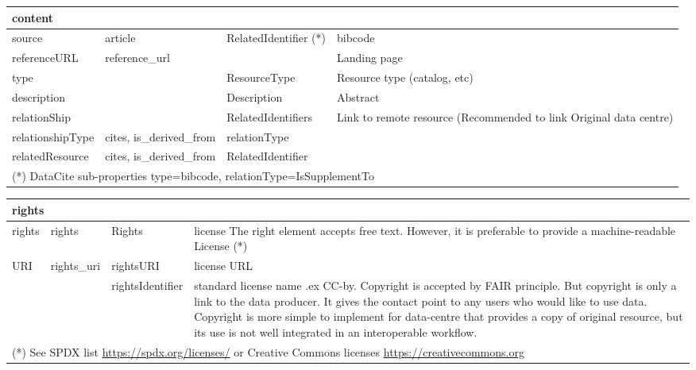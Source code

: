 \documentclass[11pt,a4paper]{ivoa}
\begin{document}
\begin{tabular}{|p{3cm}|p{3cm}|p{3cm}|p{5cm}|} \hline
\multicolumn{4}{|l|}{\textbf{content} } \\ \hline
source        & article & RelatedIdentifier (*) & bibcode\\ \hline
referenceURL  & reference\_url &  & Landing page \\ \hline
type          &  & ResourceType & Resource type (catalog, etc)\\ \hline
description   &  & Description  & Abstract\\ \hline
relationShip  &   & RelatedIdentifiers &Link to remote resource (Recommended to link Original data centre) \\ \hline
relationshipType & cites, is\_derived\_from & relationType &\\ \hline
relatedResource  & cites, is\_derived\_from & RelatedIdentifier & \\ \hline
\multicolumn{4}{l}{\small \footnotesize(*) DataCite sub-properties type=bibcode, relationType=IsSupplementTo} \\
\end{tabular}

\begin{tabular}{|p{3cm}|p{3cm}|p{3cm}|p{5cm}|} \hline
\multicolumn{4}{|l|}{\textbf{rights}} \\ \hline
rights   & rights & Rights& license
          The right element accepts free text. However, it is preferable to provide a machine-readable License (*)
         \\ \hline
URI     &  rights\_uri& rightsURI & license URL\\ \hline
        & & rightsIdentifier & standard license name .ex CC-by.
         Copyright is accepted by FAIR principle. But copyright is only a link to the data producer. It gives the contact point to any users who would like to use data. Copyright is more simple to implement for data-centre that provides a copy of original resource, but its use is not well integrated in an interoperable workflow.
         \\ \hline
\multicolumn{4}{p{\textwidth}}{\small \footnotesize(*) See SPDX list \url{https://spdx.org/licenses/} or Creative Commons licenses \url{https://creativecommons.org}}
\end{tabular}\\
\end{document}
